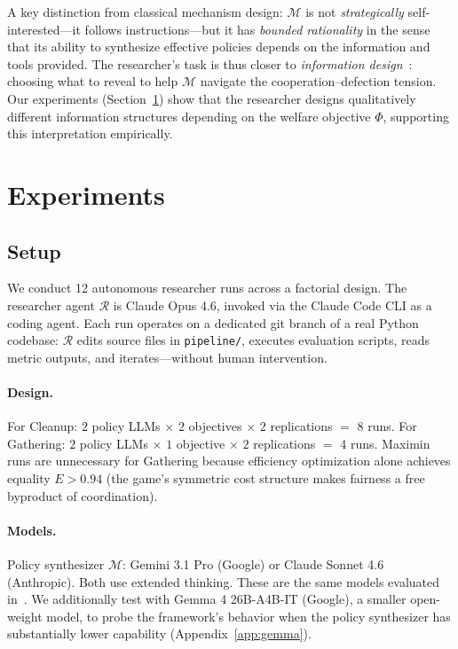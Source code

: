 \documentclass[sigconf,authordraft]{acmart}
\newcommand{\cR}{\mathcal{R}}
\newcommand{\cM}{\mathcal{M}}
\begin{document}
A key distinction from classical mechanism design: $\cM$ is not \emph{strategically} self-interested---it follows instructions---but it has \emph{bounded rationality} in the sense that its ability to synthesize effective policies depends on the information and tools provided. The researcher's task is thus closer to \emph{information design}~\cite{kamenica2011}: choosing what to reveal to help $\cM$ navigate the cooperation--defection tension. Our experiments (Section~\ref{sec:experiments}) show that the researcher designs qualitatively different information structures depending on the welfare objective $\Phi$, supporting this interpretation empirically.

\section{Experiments}
\label{sec:experiments}

\subsection{Setup}

We conduct 12 autonomous researcher runs across a factorial design. The researcher agent $\cR$ is Claude Opus 4.6, invoked via the Claude Code CLI as a coding agent. Each run operates on a dedicated git branch of a real Python codebase: $\cR$ edits source files in \texttt{pipeline/}, executes evaluation scripts, reads metric outputs, and iterates---without human intervention.

\paragraph{Design.}
For Cleanup: $2$ policy LLMs $\times$ $2$ objectives $\times$ $2$ replications $=$ 8 runs. For Gathering: $2$ policy LLMs $\times$ $1$ objective $\times$ $2$ replications $=$ 4 runs. Maximin runs are unnecessary for Gathering because efficiency optimization alone achieves equality $E > 0.94$ (the game's symmetric cost structure makes fairness a free byproduct of coordination).

\paragraph{Models.}
Policy synthesizer $\cM$: Gemini 3.1 Pro (Google) or Claude Sonnet 4.6 (Anthropic). Both use extended thinking. These are the same models evaluated in~\cite{gallego2026}. We additionally test with Gemma 4 26B-A4B-IT (Google), a smaller open-weight model, to probe the framework's behavior when the policy synthesizer has substantially lower capability (Appendix~\ref{app:gemma}).
\end{document}
